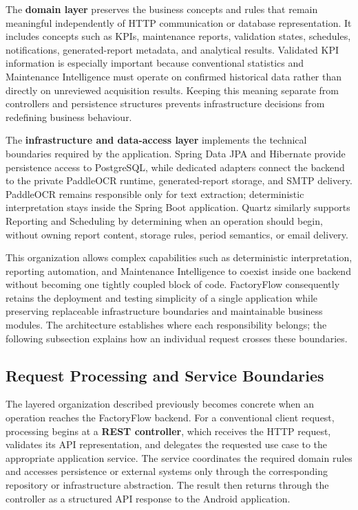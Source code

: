 The \textbf{domain layer} preserves the business concepts and rules that remain meaningful independently of HTTP communication or database representation. It includes concepts such as KPIs, maintenance reports, validation states, schedules, notifications, generated-report metadata, and analytical results. Validated KPI information is especially important because conventional statistics and Maintenance Intelligence must operate on confirmed historical data rather than directly on unreviewed acquisition results. Keeping this meaning separate from controllers and persistence structures prevents infrastructure decisions from redefining business behaviour.

The \textbf{infrastructure and data-access layer} implements the technical boundaries required by the application. Spring Data JPA and Hibernate provide persistence access to PostgreSQL, while dedicated adapters connect the backend to the private PaddleOCR runtime, generated-report storage, and SMTP delivery. PaddleOCR remains responsible only for text extraction; deterministic interpretation stays inside the Spring Boot application. Quartz similarly supports Reporting and Scheduling by determining when an operation should begin, without owning report content, storage rules, period semantics, or email delivery.

This organization allows complex capabilities such as deterministic interpretation, reporting automation, and Maintenance Intelligence to coexist inside one backend without becoming one tightly coupled block of code. FactoryFlow consequently retains the deployment and testing simplicity of a single application while preserving replaceable infrastructure boundaries and maintainable business modules. The architecture establishes where each responsibility belongs; the following subsection explains how an individual request crosses these boundaries.

\subsection{Request Processing and Service Boundaries}
\label{subsec:backend-request-processing}

The layered organization described previously becomes concrete when an operation reaches the FactoryFlow backend. For a conventional client request, processing begins at a \textbf{REST controller}, which receives the HTTP request, validates its API representation, and delegates the requested use case to the appropriate application service. The service coordinates the required domain rules and accesses persistence or external systems only through the corresponding repository or infrastructure abstraction. The result then returns through the controller as a structured API response to the Android application.


